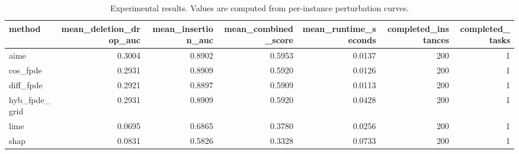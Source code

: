 \begin{table}[t]
\caption{Experimental results. Values are computed from per-instance perturbation curves.}
\label{tab:main_results_computed}
\centering
\begin{tabular}{lrrrrrr}
\toprule
method & mean\_deletion\_drop\_auc & mean\_insertion\_auc & mean\_combined\_score & mean\_runtime\_seconds & completed\_instances & completed\_tasks \\
\midrule
aime & 0.3004 & 0.8902 & 0.5953 & 0.0137 & 200 & 1 \\
cos\_fpde & 0.2931 & 0.8909 & 0.5920 & 0.0126 & 200 & 1 \\
diff\_fpde & 0.2921 & 0.8897 & 0.5909 & 0.0113 & 200 & 1 \\
hyb\_fpde\_grid & 0.2931 & 0.8909 & 0.5920 & 0.0428 & 200 & 1 \\
lime & 0.0695 & 0.6865 & 0.3780 & 0.0256 & 200 & 1 \\
shap & 0.0831 & 0.5826 & 0.3328 & 0.0733 & 200 & 1 \\
\bottomrule
\end{tabular}

\end{table}
